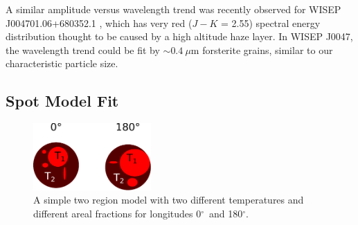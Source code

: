 \documentclass[twocolumn]{aastex6}
\newcommand{\degree}{$^\circ$}
\begin{document}
A similar amplitude versus wavelength trend was recently observed for WISEP J004701.06+680352.1 \citep{2016ApJ...829L..32L}, which has very red ($J-K$ = 2.55) spectral energy distribution thought to be caused by a high altitude haze layer.
In WISEP J0047, the wavelength trend could be fit by $\sim 0.4~\mu$m forsterite grains, similar to our characteristic particle size.

\subsection{Spot Model Fit}\label{sec:spotModel}

\begin{figure}
\begin{centering}
\includegraphics[width=0.4\textwidth]{temperature_drawing.pdf}
\caption{A simple two region model with two different temperatures and different areal fractions for longitudes 0\degree\ and 180\degree.}\label{fig:tdiffschem}
\end{centering}
\end{figure}
\end{document}
